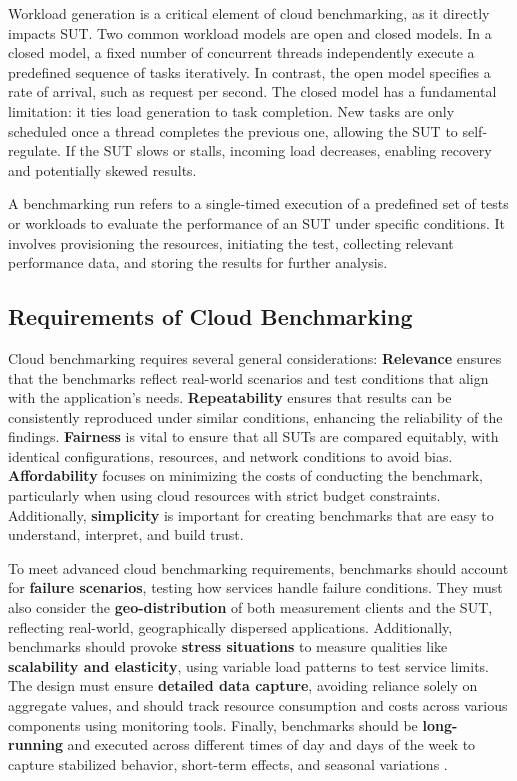 Workload generation is a critical element of cloud benchmarking, as it directly impacts SUT. Two common workload models are open and closed models. In a closed model, a fixed number of concurrent threads independently execute a predefined sequence of tasks iteratively. In contrast, the open model specifies a rate of arrival, such as request per second. The closed model has a fundamental limitation: it ties load generation to task completion. New tasks are only scheduled once a thread completes the previous one, allowing the SUT to self-regulate. If the SUT slows or stalls, incoming load decreases, enabling recovery and potentially skewed results.

A benchmarking run refers to a single-timed execution of a predefined set of tests or workloads to evaluate the performance of an SUT under specific conditions. It involves provisioning the resources, initiating the test, collecting relevant performance data, and storing the results for further analysis.

\subsection{Requirements of Cloud Benchmarking}

Cloud benchmarking requires several general considerations: \textbf{Relevance} ensures that the benchmarks reflect real-world scenarios and test conditions that align with the application's needs. \textbf{Repeatability} ensures that results can be consistently reproduced under similar conditions, enhancing the reliability of the findings. \textbf{Fairness} is vital to ensure that all SUTs are compared equitably, with identical configurations, resources, and network conditions to avoid bias. \textbf{Affordability} focuses on minimizing the costs of conducting the benchmark, particularly when using cloud resources with strict budget constraints. Additionally, \textbf{simplicity} is important for creating benchmarks that are easy to understand, interpret, and build trust.

To meet advanced cloud benchmarking requirements, benchmarks should account for \textbf{failure scenarios}, testing how services handle failure conditions. They must also consider the \textbf{geo-distribution} of both measurement clients and the SUT, reflecting real-world, geographically dispersed applications. Additionally, benchmarks should provoke \textbf{stress situations} to measure qualities like \textbf{scalability and elasticity}, using variable load patterns to test service limits. The design must ensure \textbf{detailed data capture}, avoiding reliance solely on aggregate values, and should track resource consumption and costs across various components using monitoring tools. Finally, benchmarks should be \textbf{long-running} and executed across different times of day and days of the week to capture stabilized behavior, short-term effects, and seasonal variations \cite{book_bermbach_cloud_service_benchmarking}.

